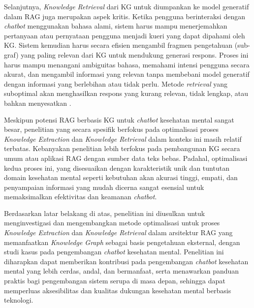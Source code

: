 Selanjutnya, \textit{Knowledge Retrieval} dari KG untuk diumpankan ke model generatif dalam RAG juga merupakan aspek kritis.
Ketika pengguna berinteraksi dengan \textit{chatbot} menggunakan bahasa alami, sistem harus mampu menerjemahkan pertanyaan atau pernyataan pengguna menjadi kueri yang dapat dipahami oleh KG.
Sistem kemudian harus secara efisien mengambil fragmen pengetahuan (sub-graf) yang paling relevan dari KG untuk mendukung generasi respons.
Proses ini harus mampu menangani ambiguitas bahasa, memahami intensi pengguna secara akurat, dan mengambil informasi yang relevan tanpa membebani model generatif dengan informasi yang berlebihan atau tidak perlu.
Metode \textit{retrieval} yang suboptimal akan menghasilkan respons yang kurang relevan, tidak lengkap, atau bahkan menyesatkan \cite{Edge2025LocalGlobalGraphRAG}.

Meskipun potensi RAG berbasis KG untuk \textit{chatbot} kesehatan mental sangat besar, penelitian yang secara spesifik berfokus pada optimalisasi proses \textit{Knowledge Extraction} dan \textit{Knowledge Retrieval} dalam konteks ini masih relatif terbatas.
Kebanyakan penelitian lebih terfokus pada pembangunan KG secara umum atau aplikasi RAG dengan sumber data teks bebas.
Padahal, optimalisasi kedua proses ini, yang disesuaikan dengan karakteristik unik dan tuntutan domain kesehatan mental seperti kebutuhan akan akurasi tinggi, empati, dan penyampaian informasi yang mudah dicerna sangat esensial untuk memaksimalkan efektivitas dan keamanan \textit{chatbot}.

Berdasarkan latar belakang di atas, penelitian ini diusulkan untuk menginvestigasi dan mengembangkan metode optimalisasi untuk proses \textit{Knowledge Extraction} dan \textit{Knowledge Retrieval} dalam arsitektur RAG yang memanfaatkan \textit{Knowledge Graph} sebagai basis pengetahuan eksternal,
dengan studi kasus pada pengembangan \textit{chatbot} kesehatan mental. Penelitian ini diharapkan dapat memberikan kontribusi pada pengembangan \textit{chatbot} kesehatan mental yang lebih cerdas, andal, dan bermanfaat,
serta menawarkan panduan praktis bagi pengembangan sistem serupa di masa depan, sehingga dapat memperluas aksesibilitas dan kualitas dukungan kesehatan mental berbasis teknologi.



